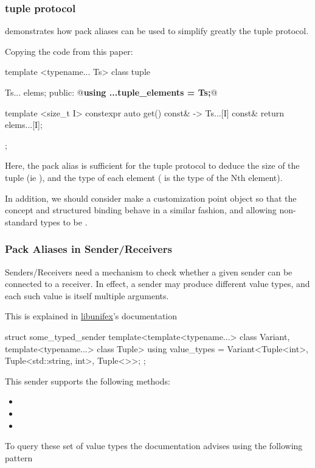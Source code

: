 \documentclass{wg21}
\begin{document}
\subsubsection{tuple protocol}
\label{sec:tuple_protocol}

 demonstrates how pack aliases can be used to simplify greatly the tuple protocol.

Copying the code from this paper:

\begin{colorblock}
template <typename... Ts>
class tuple {
    Ts... elems;
public:
    @\textbf{using ...tuple_elements = Ts;}@

    template <size_t I>
    constexpr auto get() const& -> Ts...[I] const& {
        return elems...[I];
    }
};
\end{colorblock}

Here, the  pack alias is sufficient for the tuple protocol to deduce the size
of the tuple (ie ), and the type of each element ( is the type of the Nth element).

In addition, we should consider make  a customization point object so that the  concept and structured binding
behave in a similar fashion, and allowing non-standard types to be .

\subsubsection{Pack Aliases in Sender/Receivers}

Senders/Receivers  need a mechanism to check whether a given sender can be connected to a receiver.
In effect, a sender may produce different value types, and each such value is itself multiple arguments.

This is explained in \href{https://github.com/facebookexperimental/libunifex/blob/main/doc/concepts.md}{libunifex}'s documentation

\begin{colorblock}
    struct some_typed_sender {
        template<template<typename...> class Variant, template<typename...> class Tuple>
        using value_types = Variant<Tuple<int>,
        Tuple<std::string, int>,
        Tuple<>>;
    };
\end{colorblock}
This sender supports the following methods:
\begin{itemize}
    \item {}
    \item {}
    \item {}
\end{itemize}
To query these set of value types the documentation advises using the following pattern
\end{document}
